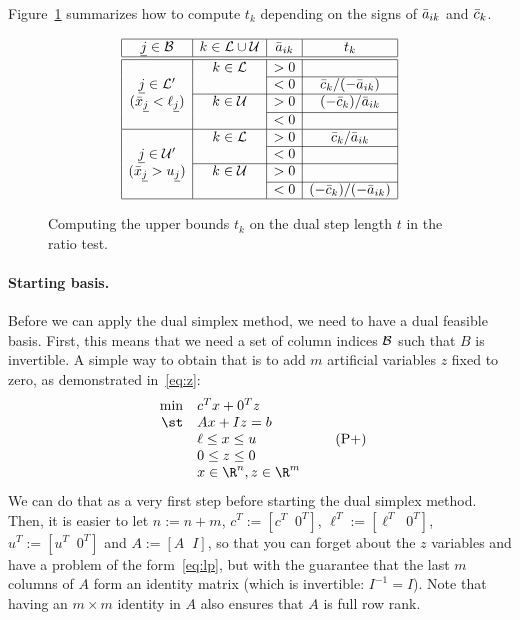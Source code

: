 Figure~\ref{fig:ratiotest} summarizes how to compute $t_k$ depending
on the signs of $\bar a_{ik}$ and $\bar c_k$.

\begin{figure}[h]
\bgroup
\def\arraystretch{1.5}
\[
\begin{array}{|c|c|c|c|}
\hline
\uj \in \B                  & k \in \NL \cup \NU & \ab_{ik} & t_k                 \\
\hline
\hline
                            & k \in \NL          & > 0      &                     \\
\cline{3-4}
\uj \in \NL'                &                    & < 0      & \cb_k / (-\ab_{ik}) \\
\cline{2-4}
(\bar x_{\uj} < \ell_{\uj}) & k \in \NU          & > 0      & (-\cb_k) / \ab_{ik} \\
\cline{3-4}
                            &                    & < 0      &                     \\
\hline
                            & k \in \NL          & > 0      & \cb_k / \ab_{ik} \\
\cline{3-4}
\uj \in \NU'                &                    & < 0      &                     \\
\cline{2-4}
(\bar x_{\uj} > u_{\uj})    & k \in \NU          & > 0      &                     \\
\cline{3-4}
                            &                    & < 0      & (-\cb_k) / (-\ab_{ik}) \\
\hline
\end{array}
\]
\egroup
\caption{Computing the upper bounds $t_k$ on the dual step length $t$
	in the ratio test.}
\label{fig:ratiotest}
\end{figure}


\paragraph{Starting basis.}
Before we can apply the dual simplex method, we need to have
a dual feasible basis. First, this means that we need a set of
column indices $\mathcal{B}$ such that $B$ is invertible.
A simple way to obtain that is to add $m$ artificial variables
$z$ fixed to zero, as demonstrated in~\eqref{eq:z}:
\begin{equation}
\begin{array}{rl}
\min & c^T x + 0^T z \\
\st  & A x + I z = b \\
     & \ell \leq x \leq u \\
     & 0 \leq z \leq 0 \\
     & x \in \R^n, z \in \R^m
\end{array}
\tag{P+}
\label{eq:z}
\end{equation}
We can do that as a very first step before
starting the dual simplex method. Then, it is easier to let
$n := n + m$,
$c^T := [c^T \;\; 0^T]$,
$\ell^T := [\ell^T \;\; 0^T]$,
$u^T := [u^T \;\; 0^T]$
and $A := [A \;\; I]$,
so that you can forget about the $z$ variables and have a problem
of the form~\eqref{eq:lp}, but with the guarantee that the last $m$
columns of $A$ form an identity matrix (which is invertible: $I^{-1} = I$).
Note that having an $m \times m$ identity in $A$ also ensures
that $A$ is full row rank.

